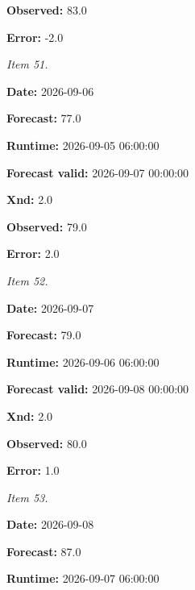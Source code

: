 \documentclass[11pt]{article}
\begin{document}
\par\noindent\textbf{Observed:} 83.0

\par\noindent\textbf{Error:} -2.0

\par\noindent\textit{Item 51.}\par \par\noindent\textbf{Date:} 2026-09-06

\par\noindent\textbf{Forecast:} 77.0

\par\noindent\textbf{Runtime:} 2026-09-05 06:00:00

\par\noindent\textbf{Forecast valid:} 2026-09-07 00:00:00

\par\noindent\textbf{Xnd:} 2.0

\par\noindent\textbf{Observed:} 79.0

\par\noindent\textbf{Error:} 2.0

\par\noindent\textit{Item 52.}\par \par\noindent\textbf{Date:} 2026-09-07

\par\noindent\textbf{Forecast:} 79.0

\par\noindent\textbf{Runtime:} 2026-09-06 06:00:00

\par\noindent\textbf{Forecast valid:} 2026-09-08 00:00:00

\par\noindent\textbf{Xnd:} 2.0

\par\noindent\textbf{Observed:} 80.0

\par\noindent\textbf{Error:} 1.0

\par\noindent\textit{Item 53.}\par \par\noindent\textbf{Date:} 2026-09-08

\par\noindent\textbf{Forecast:} 87.0

\par\noindent\textbf{Runtime:} 2026-09-07 06:00:00
\end{document}
